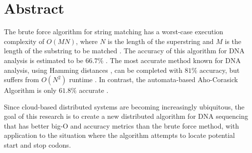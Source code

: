 \documentclass[12pt]{article}
\begin{document}
\section*{Abstract}
\indent
\par{The brute force algorithm for string matching has a worst-case execution complexity of $O(MN)$, where $N$ is the length of the superstring and $M$ is the length of the substring to be matched \cite{cormen_string_2009, pandiselvam_comparative_2014, skiena_algorithm_2010}.
The accuracy of this algorithm for DNA analysis is estimated to be $66.7\%$ \cite{pandiselvam_comparative_2014}. The most accurate method known for DNA analysis, using Hamming distances \cite{hamming_error_1950}, can be completed with $81\%$ accuracy, but suffers from $O(N^2)$ runtime \cite{pandiselvam_comparative_2014}. In contrast, the automata-based Aho-Corasick Algorithm \cite{aho_efficient_1975} is only $61.8\%$ accurate \cite{pandiselvam_comparative_2014}.
} 
\par{Since cloud-based distributed systems are becoming increasingly ubiquitous, the goal of this research is to create a new distributed algorithm for DNA sequencing that has better big-O and accuracy metrics than the brute force method, with application to the situation where the algorithm attempts to locate potential start and stop codons.
}

\newpage


\end{document}
